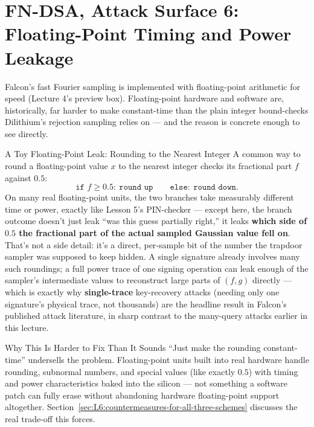 \section{FN-DSA, Attack Surface 6: Floating-Point Timing and Power Leakage}
\label{sec:L6:floating-point-leakage}

Falcon's fast Fourier sampling is implemented with floating-point arithmetic for speed (Lecture 4's preview box). Floating-point hardware and software are, historically, far harder to make constant-time than the plain integer bound-checks Dilithium's rejection sampling relies on --- and the reason is concrete enough to see directly.

\begin{exbox}{A Toy Floating-Point Leak: Rounding to the Nearest Integer}
A common way to round a floating-point value $x$ to the nearest integer checks its fractional part $f$ against $0.5$:
$$
\texttt{if } f \ge 0.5:\ \texttt{round up} \qquad \texttt{else}:\ \texttt{round down.}
$$
On many real floating-point units, the two branches take measurably different time or power, exactly like Lesson 5's PIN-checker --- except here, the branch outcome doesn't just leak ``was this guess partially right,'' it leaks \textbf{which side of $0.5$ the fractional part of the actual sampled Gaussian value fell on}. That's not a side detail: it's a direct, per-sample bit of the number the trapdoor sampler was supposed to keep hidden. A single signature already involves many such roundings; a full power trace of one signing operation can leak enough of the sampler's intermediate values to reconstruct large parts of $(f,g)$ directly --- which is exactly why \textbf{single-trace} key-recovery attacks (needing only one signature's physical trace, not thousands) are the headline result in Falcon's published attack literature, in sharp contrast to the many-query attacks earlier in this lecture.
\end{exbox}

\begin{rmkbox}{Why This Is Harder to Fix Than It Sounds}
``Just make the rounding constant-time'' undersells the problem. Floating-point units built into real hardware handle rounding, subnormal numbers, and special values (like exactly $0.5$) with timing and power characteristics baked into the silicon --- not something a software patch can fully erase without abandoning hardware floating-point support altogether. Section~\ref{sec:L6:countermeasures-for-all-three-schemes} discusses the real trade-off this forces.
\end{rmkbox}

